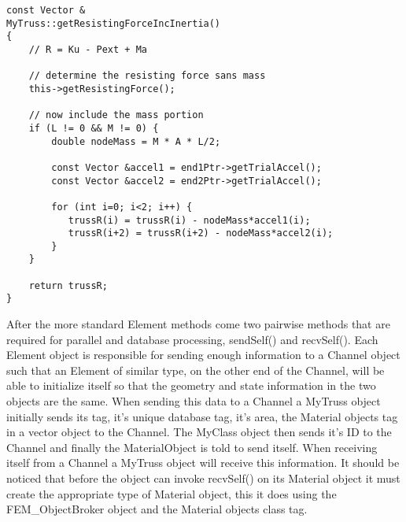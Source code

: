 \documentclass[12pt]{article}
\begin{document}
{\begin{verbatim}
const Vector &
MyTruss::getResistingForceIncInertia()
{	
    // R = Ku - Pext + Ma

    // determine the resisting force sans mass
    this->getResistingForce();	

    // now include the mass portion
    if (L != 0 && M != 0) {
        double nodeMass = M * A * L/2;

        const Vector &accel1 = end1Ptr->getTrialAccel();
        const Vector &accel2 = end2Ptr->getTrialAccel();	
	
        for (int i=0; i<2; i++) {
           trussR(i) = trussR(i) - nodeMass*accel1(i);
           trussR(i+2) = trussR(i+2) - nodeMass*accel2(i);
        }
    }

    return trussR;    
}
\end{verbatim}}

After the more standard Element methods come two pairwise methods that
are required for parallel and database processing, {\sf sendSelf()}
and {\sf recvSelf()}. Each Element object is responsible for sending
enough information to a Channel object such that an Element of similar type,
on the other end of the Channel, will be able to initialize itself so
that the geometry and state information in the two objects are the same.
When sending this data to a Channel a MyTruss object initially sends
its tag, it's unique database tag, it's area, the Material objects tag
in a vector object to the Channel. The MyClass object then sends it's
ID to the Channel and finally the MaterialObject is told to send itself.
When receiving itself from a Channel a MyTruss object will receive
this information. It should be noticed that before the object can
invoke {\sf recvSelf()} on its Material object it must create the
appropriate type of Material object, this it does using the
FEM\_ObjectBroker object and the Material objects class tag.
\end{document}
